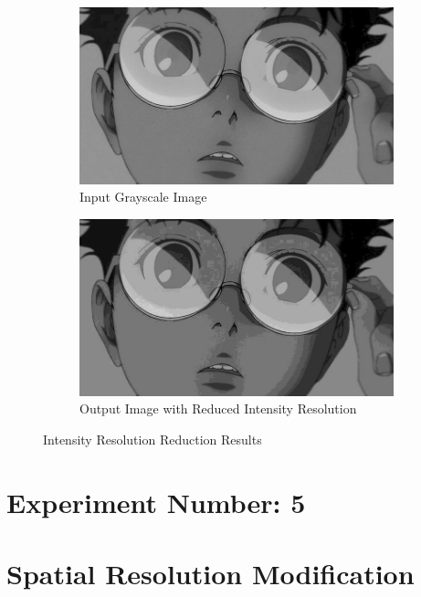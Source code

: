 \documentclass[12pt,a4paper]{article}
\begin{document}
\begin{figure}[H]
  \centering
  \begin{subfigure}[b]{0.8\textwidth}
    \centering
    \includegraphics[width=\textwidth]{intensity/reduced_8bit.jpg}
    \caption{Input Grayscale Image}
  \end{subfigure}
  \vspace{1em}
  \begin{subfigure}[b]{0.8\textwidth}
    \centering
    \includegraphics[width=\textwidth]{intensity/reduced_4bit.jpg}
    \caption{Output Image with Reduced Intensity Resolution}
  \end{subfigure}
  \caption{Intensity Resolution Reduction Results}
  \label{fig:intensity_resolution}
\end{figure}

\newpage
\section*{Experiment Number: 5}
\section{Spatial Resolution Modification}
\end{document}
